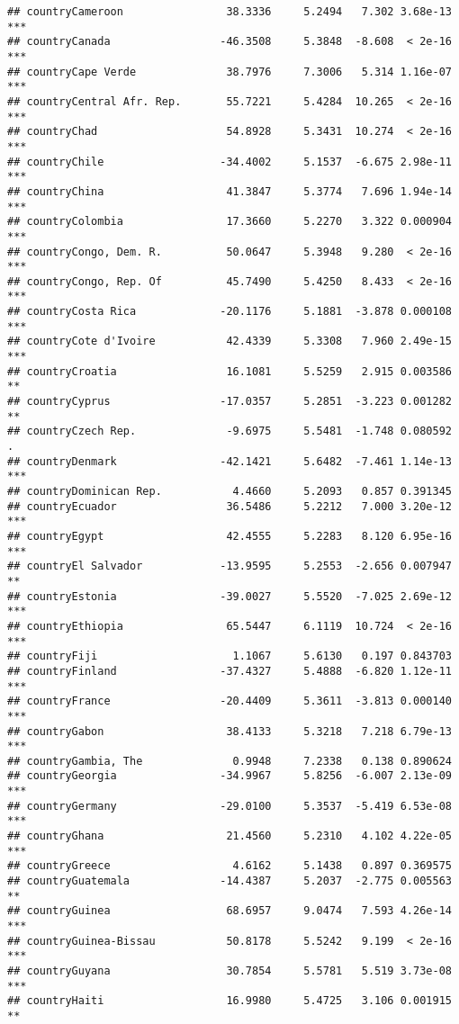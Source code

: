 \documentclass[
  11pt,
]{article}
\begin{document}
\begin{verbatim}
## countryCameroon                38.3336     5.2494   7.302 3.68e-13 ***
## countryCanada                 -46.3508     5.3848  -8.608  < 2e-16 ***
## countryCape Verde              38.7976     7.3006   5.314 1.16e-07 ***
## countryCentral Afr. Rep.       55.7221     5.4284  10.265  < 2e-16 ***
## countryChad                    54.8928     5.3431  10.274  < 2e-16 ***
## countryChile                  -34.4002     5.1537  -6.675 2.98e-11 ***
## countryChina                   41.3847     5.3774   7.696 1.94e-14 ***
## countryColombia                17.3660     5.2270   3.322 0.000904 ***
## countryCongo, Dem. R.          50.0647     5.3948   9.280  < 2e-16 ***
## countryCongo, Rep. Of          45.7490     5.4250   8.433  < 2e-16 ***
## countryCosta Rica             -20.1176     5.1881  -3.878 0.000108 ***
## countryCote d'Ivoire           42.4339     5.3308   7.960 2.49e-15 ***
## countryCroatia                 16.1081     5.5259   2.915 0.003586 ** 
## countryCyprus                 -17.0357     5.2851  -3.223 0.001282 ** 
## countryCzech Rep.              -9.6975     5.5481  -1.748 0.080592 .  
## countryDenmark                -42.1421     5.6482  -7.461 1.14e-13 ***
## countryDominican Rep.           4.4660     5.2093   0.857 0.391345    
## countryEcuador                 36.5486     5.2212   7.000 3.20e-12 ***
## countryEgypt                   42.4555     5.2283   8.120 6.95e-16 ***
## countryEl Salvador            -13.9595     5.2553  -2.656 0.007947 ** 
## countryEstonia                -39.0027     5.5520  -7.025 2.69e-12 ***
## countryEthiopia                65.5447     6.1119  10.724  < 2e-16 ***
## countryFiji                     1.1067     5.6130   0.197 0.843703    
## countryFinland                -37.4327     5.4888  -6.820 1.12e-11 ***
## countryFrance                 -20.4409     5.3611  -3.813 0.000140 ***
## countryGabon                   38.4133     5.3218   7.218 6.79e-13 ***
## countryGambia, The              0.9948     7.2338   0.138 0.890624    
## countryGeorgia                -34.9967     5.8256  -6.007 2.13e-09 ***
## countryGermany                -29.0100     5.3537  -5.419 6.53e-08 ***
## countryGhana                   21.4560     5.2310   4.102 4.22e-05 ***
## countryGreece                   4.6162     5.1438   0.897 0.369575    
## countryGuatemala              -14.4387     5.2037  -2.775 0.005563 ** 
## countryGuinea                  68.6957     9.0474   7.593 4.26e-14 ***
## countryGuinea-Bissau           50.8178     5.5242   9.199  < 2e-16 ***
## countryGuyana                  30.7854     5.5781   5.519 3.73e-08 ***
## countryHaiti                   16.9980     5.4725   3.106 0.001915 ** 

\end{verbatim}
\end{document}
